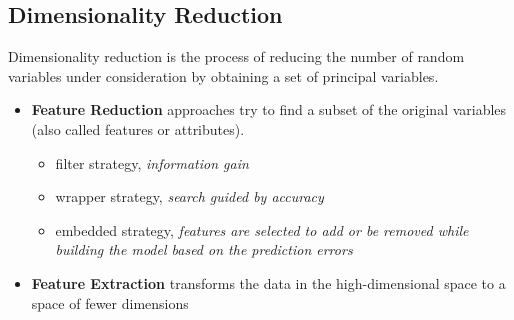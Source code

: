 \documentclass[11pt]{article}
\theoremstyle{definition}
\begin{document}
\subsection{Dimensionality Reduction}
Dimensionality reduction is the process of reducing the number of random variables under consideration by obtaining a set of principal variables.
\begin{itemize}
	\item \textbf{Feature Reduction} approaches try to find a subset of the original variables (also called features or attributes).
	\begin{itemize}
		\item filter strategy, \emph{information gain}
		\item wrapper strategy, \emph{search guided by accuracy}
		\item embedded strategy, \emph{features are selected to add or be removed while building the model based on the prediction errors}
	\end{itemize}
	\item \textbf{Feature Extraction} transforms the data in the high-dimensional space to a space of fewer dimensions
\end{itemize}
\end{document}
